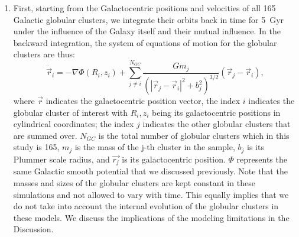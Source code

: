 \documentclass[draft]{aa}
\begin{document}
      \begin{enumerate}
          \item First, starting from the Galactocentric positions and velocities of all 165 Galactic globular clusters, we integrate their orbits back in time for 5~Gyr under the influence of the Galaxy itself and their mutual influence. In the backward integration, the system of equations of motion for the globular clusters are thus: 
          \begin{equation}
          \ddot{\vec{r}}_i = -\nabla \Phi(R_i,z_i) + \left.\sum_{j\neq i}^{N_{GC}} \frac{Gm_j}{\left(|\vec{r}_j - \vec{r}_i|^2 + b_j^2\right)^{3/2}}\right. \left(\vec{r}_j - \vec{r}_i\right),
          \end{equation}\label{eq:GCNBody} 
          \noindent where $\vec{r}$ indicates the galactocentric position vector, the index $i$ indicates the globular cluster of interest with $R_i,z_i$ being its galactocentric positions in cylindrical coordinates; the index $j$ indicates the other globular clusters that are summed over. $N_{GC}$ is the total number of globular clusters which in this study is 165, $m_j$ is the mass of the j-th cluster in the sample, $b_j$ is its Plummer scale radius, and $\vec{r_j}$ is its galactocentric position. $\Phi$ represents the same Galactic smooth potential that we discussed previously\citep[][Model~II, in the present case]{2017A&A...598A..66P}. Note that the masses and sizes of the globular clusters are kept constant in these simulations and not allowed to vary with time. This equally implies that we do not take into account the internal evolution of the globular clusters in these models. We discuss the implications of the modeling limitations in the Discussion.
      

\end{enumerate}
\end{document}
